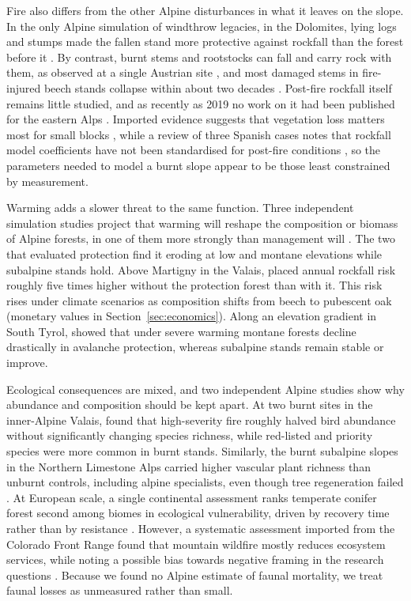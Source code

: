 \documentclass[11pt,a4paper]{article}
\begin{document}
Fire also differs from the other Alpine disturbances in what it leaves on the slope. In the only Alpine simulation of windthrow legacies, in the Dolomites, lying logs and stumps made the fallen stand more protective against rockfall than the forest before it \citep{costa_biological_2021}. By contrast, burnt stems and rootstocks can fall and carry rock with them, as observed at a single Austrian site \citep{melzner_brief_2019}, and most damaged stems in fire-injured beech stands collapse within about two decades \citep{maringer_temporal_2016}. Post-fire rockfall itself remains little studied, and as recently as 2019 no work on it had been published for the eastern Alps \citep{melzner_brief_2019}. Imported evidence suggests that vegetation loss matters most for small blocks \citep{asteriou_assessing_2025}, while a review of three Spanish cases notes that rockfall model coefficients have not been standardised for post-fire conditions \citep{sarro_effects_2021}, so the parameters needed to model a burnt slope appear to be those least constrained by measurement.

Warming adds a slower threat to the same function. Three independent simulation studies project that warming will reshape the composition or biomass of Alpine forests, in one of them more strongly than management will \citep{schumacher_relative_2006, moos_climate_2021, hillebrand_contrasting_2023}. The two that evaluated protection find it eroding at low and montane elevations while subalpine stands hold. Above Martigny in the Valais, \citet{moos_climate_2021} placed annual rockfall risk roughly five times higher without the protection forest than with it. This risk rises under climate scenarios as composition shifts from beech to pubescent oak (monetary values in Section~\ref{sec:economics}). Along an elevation gradient in South Tyrol, \citet{hillebrand_contrasting_2023} showed that under severe warming montane forests decline drastically in avalanche protection, whereas subalpine stands remain stable or improve.

Ecological consequences are mixed, and two independent Alpine studies show why abundance and composition should be kept apart. At two burnt sites in the inner-Alpine Valais, \citet{rey_effects_2019} found that high-severity fire roughly halved bird abundance without significantly changing species richness, while red-listed and priority species were more common in burnt stands. Similarly, the burnt subalpine slopes in the Northern Limestone Alps carried higher vascular plant richness than unburnt controls, including alpine specialists, even though tree regeneration failed \citep{degiuli_arrested_2024}. At European scale, a single continental assessment ranks temperate conifer forest second among biomes in ecological vulnerability, driven by recovery time rather than by resistance \citep{arrogantefunes_mapping_2024}. However, a systematic assessment imported from the Colorado Front Range found that mountain wildfire mostly reduces ecosystem services, while noting a possible bias towards negative framing in the research questions \citep{vukomanovic_systematic_2019}. Because we found no Alpine estimate of faunal mortality, we treat faunal losses as unmeasured rather than small.
\end{document}
